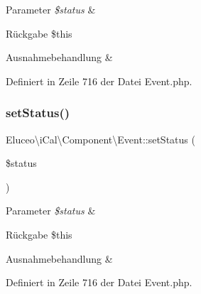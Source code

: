 \begin{DoxyParams}{Parameter}
{\em \$status} & \\
\hline
\end{DoxyParams}
\begin{DoxyReturn}{Rückgabe}
\$this
\end{DoxyReturn}

\begin{DoxyExceptions}{Ausnahmebehandlung}
{\em } & \\
\hline
\end{DoxyExceptions}


Definiert in Zeile 716 der Datei Event.\+php.

\mbox{\label{class_eluceo_1_1i_cal_1_1_component_1_1_event_a52ea8343945673a010bd114d50399702}} 
\subsubsection{\texorpdfstring{set\+Status()}{setStatus()}\hspace{0.1cm}{\footnotesize\ttfamily [3/3]}}
{\footnotesize\ttfamily Eluceo\textbackslash{}i\+Cal\textbackslash{}\+Component\textbackslash{}\+Event\+::set\+Status (\begin{DoxyParamCaption}\item[{}]{\$status }\end{DoxyParamCaption})}


\begin{DoxyParams}{Parameter}
{\em \$status} & \\
\hline
\end{DoxyParams}
\begin{DoxyReturn}{Rückgabe}
\$this
\end{DoxyReturn}

\begin{DoxyExceptions}{Ausnahmebehandlung}
{\em } & \\
\hline
\end{DoxyExceptions}


Definiert in Zeile 716 der Datei Event.\+php.

\mbox{\label{class_eluceo_1_1i_cal_1_1_component_1_1_event_ad632fd01f9c5094a1e705c21fc1dddf1}} 
